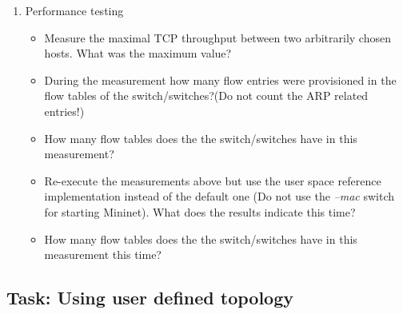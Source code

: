 \documentclass{article}
\begin{document}
\begin{enumerate}
    \item Performance testing
          \begin{itemize}
              \item Measure the maximal TCP throughput between two arbitrarily chosen hosts. What was the maximum
                    value?
              \item During the measurement how many flow entries were provisioned in the flow tables of the
                    switch/switches?(Do
                    not count the ARP related entries!)
              \item How many flow tables does the the switch/switches have in this measurement?
              \item Re-execute the measurements above but use the user space reference implementation instead of the
                    default one
                    (Do not use the \emph{--mac} switch for starting Mininet). What does the results indicate this
                    time?
              \item How many flow tables does the the switch/switches have in this measurement this time?
          \end{itemize}

\end{enumerate}

\subsection{Task: Using user defined topology}
\end{document}
